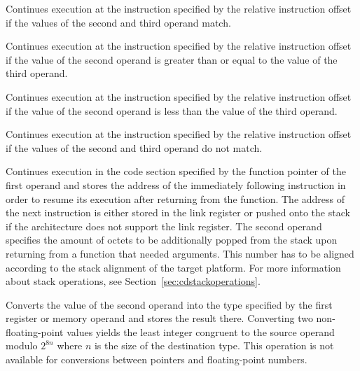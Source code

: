 Continues execution at the instruction specified by the relative instruction offset if the values of the second and third operand match.


Continues execution at the instruction specified by the relative instruction offset if the value of the second operand is greater than or equal to the value of the third operand.


Continues execution at the instruction specified by the relative instruction offset if the value of the second operand is less than the value of the third operand.


Continues execution at the instruction specified by the relative instruction offset if the values of the second and third operand do not match.


Continues execution in the code section specified by the function pointer of the first operand and stores the address of the immediately following instruction in order to resume its execution after returning from the function.
The address of the next instruction is either stored in the link register or pushed onto the stack if the architecture does not support the link register.
The second operand specifies the amount of octets to be additionally popped from the stack upon returning from a function that needed arguments.
This number has to be aligned according to the stack alignment of the target platform.
For more information about stack operations, see Section~\ref{sec:cdstackoperations}.


Converts the value of the second operand into the type specified by the first register or memory operand and stores the result there.
Converting two non-floating-point values yields the least integer congruent to the source operand modulo $2^{8n}$ where $n$ is the size of the destination type.
This operation is not available for conversions between pointers and floating-point numbers.


